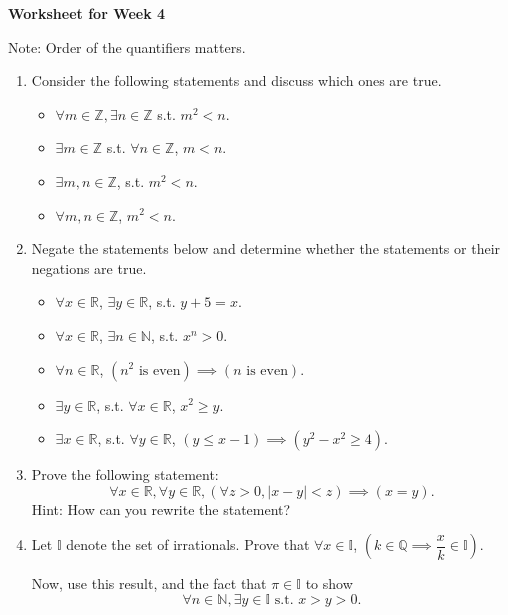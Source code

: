 \documentclass[12pt]{article}
\newcommand{\st}{\text{ s.t. }}
\begin{document}
\centerline{\bf\large Worksheet for Week 4}

\vspace{25pt}


Note: Order of the quantifiers matters.

\begin{enumerate}

\item Consider the following statements and discuss which ones are true.

\begin{itemize}
\item $\forall m\in\mathbb Z, \exists n\in\mathbb Z$ s.t. $m^2<n$.
\item $\exists m\in\mathbb Z$ s.t. $\forall n\in\mathbb Z$, $m<n$.
\item $\exists m,n\in\mathbb Z$, s.t. $m^2<n$.
\item $\forall m,n\in\mathbb Z$, $m^2<n$.
\end{itemize}

\item Negate the statements below and determine whether the statements or their negations are true.

\begin{itemize}
\item $\forall x\in\mathbb R$, $\exists y\in\mathbb R$, s.t. $y+5=x$.
\item $\forall x\in\mathbb R$, $\exists n\in\mathbb N$, s.t. $x^n>0$.
\item $\forall n\in\mathbb R$, $(n^2\text{ is even})\implies (n \text{ is even})$.
\item $\exists y\in\mathbb R$, s.t. $\forall x\in\mathbb R$, $x^2\geq y$.
\item $\exists x\in\mathbb R$, s.t. $\forall y\in\mathbb R$, $(y\leq x-1)\implies (y^2-x^2\geq 4)$.
\end{itemize}

\item Prove the following statement:
\[ \forall x\in\mathbb R, \forall y\in\mathbb R, (\forall z>0, |x-y|<z)\implies (x=y).  \]
Hint: How can you rewrite the statement?

\item Let $\mathbb I$ denote the set of irrationals. Prove that $\forall x\in\mathbb I$, $(k\in\mathbb Q\implies \dfrac{x}{k}\in\mathbb I)$.

Now, use this result, and the fact that $\pi\in\mathbb I$ to show
\[\forall n\in\mathbb N, \exists y\in\mathbb I \st x>y>0.\]


\end{enumerate}
\end{document}

